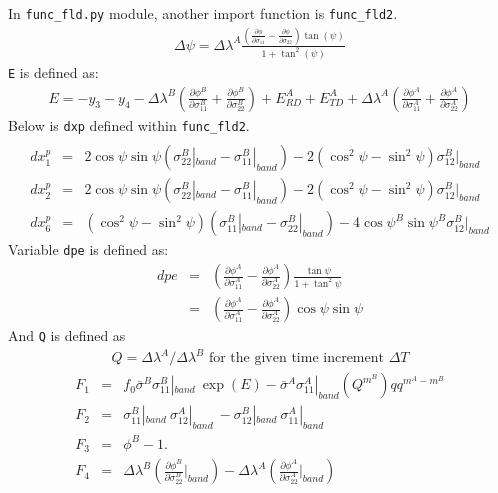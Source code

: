 \documentclass[12pt]{amsart}
\begin{document}
In \verb|func_fld.py| module, another import function is \verb|func_fld2|.
\begin{eqnarray}
  \label{eq:dpsi}
  \Delta\psi=\Delta{\lambda}^A \frac{ (\frac{\partial \phi}{\partial\sigma_{11}}-\frac{\partial \phi}{\partial\sigma_{22}}) \tan(\psi)}    {1+\tan^2(\psi)}
\end{eqnarray}
\verb|E| is defined as:
\begin{eqnarray}
  \label{eq:yancien}
  E = -y_3 - y_4 - \Delta{\lambda}^B (\frac{\partial \phi^B}{\partial\sigma^B_{11}}+\frac{\partial \phi^B}{\partial\sigma^B_{22}})+E_{RD}^A+E_{TD}^A+\Delta\lambda^A(\frac{\partial \phi^A}{\partial\sigma^A_{11}}+\frac{\partial \phi^A}{\partial\sigma^A_{22}})
\end{eqnarray}
Below is \verb|dxp| defined within \verb|func_fld2|.
\begin{eqnarray}
  \label{eq:dxp}
  \\
  dx^p_1&=&2\cos\psi\sin\psi(\sigma_{22}^B|_{band}-\sigma_{11}^B|_{band})  - 2 (\cos^2\psi-\sin^2\psi) \sigma_{12}^B|_{band} \nonumber\\
  dx^p_2&=&2\cos\psi\sin\psi(\sigma_{22}^B|_{band}-\sigma_{11}^B|_{band})    - 2 (\cos^2\psi-\sin^2\psi) \sigma_{12}^B|_{band}\nonumber \\
  dx^p_6&=&(\cos^2\psi-\sin^2\psi) (\sigma^B_{11}|_{band}-\sigma^B_{22}|_{band}) - 4 \cos\psi^B \sin\psi^B \sigma_{12}^B|_{band}\nonumber
\end{eqnarray}
Variable \verb|dpe| is defined as:
\begin{eqnarray}
  \label{eq:dpe}
  dpe &=&(\frac{\partial \phi^A}{\partial\sigma^A_{11}}-\frac{\partial \phi^A}{\partial\sigma^A_{22}}) \frac{\tan\psi }{1+\tan^2\psi}\\
      &=&(\frac{\partial \phi^A}{\partial\sigma^A_{11}}-\frac{\partial \phi^A}{\partial\sigma^A_{22}})\cos\psi\sin\psi\nonumber
\end{eqnarray}
And \verb|Q| is defined as
\begin{eqnarray}
  \label{eq:Q}
  Q = \Delta\lambda^A/\Delta\lambda^B \text{ for the given time increment } \Delta T
\end{eqnarray}
\begin{eqnarray}
  \label{eq:func2_Fi}
  F_1&=&f_0 \bar{\sigma}^B\sigma_{11}^B|_{band}\ \exp(E) - \bar{\sigma}^A \sigma_{11}^A|_{band} (Q^{m^B})qq^{m^A-m^B}\\
  F_2&=&\sigma_{11}^B|_{band}\ \sigma_{12}^A|_{band}\ -\sigma_{12}^B|_{band}\ \sigma_{11}^A|_{band}\nonumber\\
  F_3&=&\phi^B-1.\nonumber \\
  F_4&=&\Delta\lambda^B (\frac{\partial \phi^B}{\partial\sigma^B_{22}}|_{band}) - \Delta\lambda^A (\frac{\partial \phi^A}{\partial\sigma^A_{22}}|_{band})\nonumber
\end{eqnarray}
\end{document}
